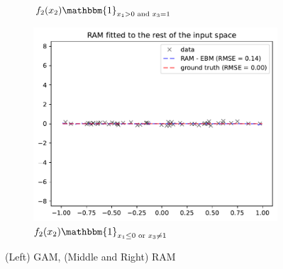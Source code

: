 \documentclass{beamer}
\newcommand{\when}[1]{\mathbbm{1}_{#1}}
\begin{document}
\begin{frame}
\begin{figure}[htbp]
\begin{subfigure}{0.32\textwidth}
        \caption{\(f_2(x_2) \when{x_1 > 0 \text{ and } x_3 = 1}\)}
        \label{subfig:regional_gam_1}
    \end{subfigure}
    \begin{subfigure}{0.32\textwidth}
        \centering
        \includegraphics[width=\textwidth]{figures/regional_gam_subreg_2}
        \caption{\(f_2(x_2) \when{x_1 \leq 0 \text{ or } x_3 \neq 1}\)}
        \label{subfig:regional_gam_2}
    \end{subfigure}
    \caption{(Left) GAM, (Middle and Right) RAM}
    \label{fig:ram_example}
\end{figure}
\end{frame}
\end{document}
